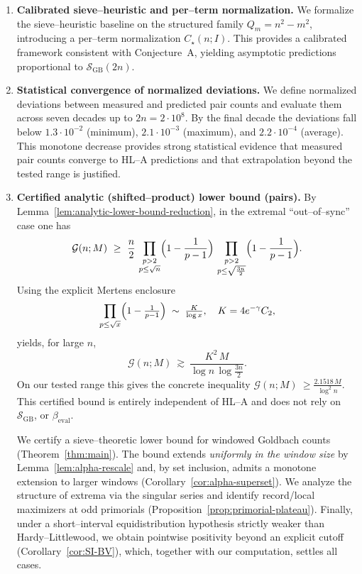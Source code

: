 \documentclass[11pt]{article}
\theoremstyle{inline}
\theoremstyle{break}
\theoremstyle{break}
\theoremstyle{break}
\theoremstyle{break}
\theoremstyle{break}
\theoremstyle{break}
\theoremstyle{break}
\theoremstyle{inline}
\newcommand{\xLambdaMinLimit}{1.3\cdot 10^{-2}} %
\newcommand{\xLambdaMaxLimit}{2.1\cdot 10^{-3}} %
\newcommand{\xLambdaAvgLimit}{2.2\cdot 10^{-4}} %
\newcommand{\SGB}{\mathcal{S}_{\scriptscriptstyle\mathrm{GB}}}
\newcommand{\betacal}{\beta_{\mathrm{eval}}}
\begin{document}
\begin{enumerate}\itemsep4pt

  \item \textbf{Calibrated sieve–heuristic and per–term normalization.}
  We formalize the sieve–heuristic baseline on the structured family
  \(Q_m = n^2 - m^2\), introducing a per–term normalization \(C_\star(n;I)\).
  This provides a calibrated framework consistent with Conjecture~A,
  yielding asymptotic predictions proportional to \(\SGB(2n)\).

 \item \textbf{Statistical convergence of normalized deviations.}
  We define normalized deviations between measured and predicted pair counts
  and evaluate them across seven decades up to \(2n = 2\cdot 10^8\).
  By the final decade the deviations fall below
  \(\xLambdaMinLimit\) (minimum), \(\xLambdaMaxLimit\) (maximum),
  and \(\xLambdaAvgLimit\) (average).
  This monotone decrease provides strong statistical evidence that measured
   pair counts converge to HL–A predictions and that extrapolation beyond the
  tested range is justified.

\item \textbf{Certified analytic (shifted–product) lower bound (pairs).}
  By Lemma~\ref{lem:analytic-lower-bound-reduction}, in the extremal
  “out–of–sync” case one has
  \begin{equation}
    \mathcal{G}(n;M)\ \ge\ \frac{n}{2}\,
    \prod_{\substack{p>2\\ p\le \sqrt{n}}}\Bigl(1-\frac{1}{p-1}\Bigr)\,
    \prod_{\substack{p>2\\ p\le \sqrt{\frac{3n}{2}}}}\Bigl(1-\frac{1}{p-1}\Bigr).
  \end{equation}
  Using the explicit Mertens enclosure
  \cite{RosserSchoenfeld1962, Dusart2010, HardyLittlewood1923, MontgomeryVaughan2007}
  \[
    \prod_{p\le \sqrt{x}}\Bigl(1-\tfrac{1}{p-1}\Bigr)
     \;\sim\; \tfrac{K}{\log x},\quad K=4e^{-\gamma}C_2,
  \]
  yields, for large \(n\),
  \begin{equation}
    \mathcal{G}(n;M)\ \gtrsim\ \frac{K^2\,M}{\log{n}\,\log{\frac{3n}{2}}}.
  \end{equation}
  On our tested range this gives the concrete inequality
  \(\mathcal{G}(n;M)\ \ge \tfrac{2.1518\,M}{\log^2{n}}\).
  This certified bound is entirely independent of HL–A and does not rely 
  on \( \SGB \), or \( \betacal \).

  We certify a sieve–theoretic lower bound for windowed Goldbach counts (Theorem~\ref{thm:main}). 
  The bound extends \emph{uniformly in the window size} by Lemma~\ref{lem:alpha-rescale} and, by set inclusion, admits a monotone extension to larger windows (Corollary~\ref{cor:alpha-superset}). 
  We analyze the structure of extrema via the singular series and identify record/local maximizers at odd primorials (Proposition~\ref{prop:primorial-plateau}). 
  Finally, under a short–interval equidistribution hypothesis strictly weaker than Hardy–Littlewood, we obtain pointwise positivity beyond an explicit cutoff (Corollary~\ref{cor:SI-BV}), which,   together with our computation, settles all cases.


\end{enumerate}
\end{document}
